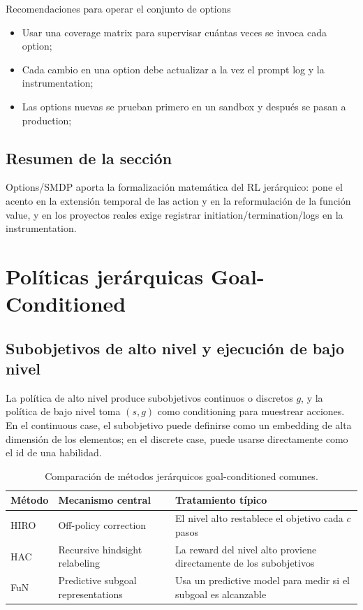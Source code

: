 \documentclass[a4paper]{article}
\begin{document}
\begin{importantbox}{Recomendaciones para operar el conjunto de options}
\begin{itemize}
    \item Usar una coverage matrix para supervisar cuántas veces se invoca cada option;
    \item Cada cambio en una option debe actualizar a la vez el prompt log y la instrumentation;
    \item Las options nuevas se prueban primero en un sandbox y después se pasan a production;
\end{itemize}
\end{importantbox}

\subsection{Resumen de la sección}

Options/SMDP aporta la formalización matemática del RL jerárquico: pone el acento en la extensión temporal de las action y en la reformulación de la función value, y en los proyectos reales exige registrar initiation/termination/logs en la instrumentation.
\section{Políticas jerárquicas Goal-Conditioned}

\subsection{Subobjetivos de alto nivel y ejecución de bajo nivel}

La política de alto nivel produce subobjetivos continuos o discretos \(g\), y la política de bajo nivel toma \((s, g)\) como conditioning para muestrear acciones. En el continuous case, el subobjetivo puede definirse como un embedding de alta dimensión de los elementos; en el discrete case, puede usarse directamente como el id de una habilidad.

\begin{table}[H]
\centering
\begin{tabular}{p{3cm}p{5cm}p{4cm}}
\toprule
Método & Mecanismo central & Tratamiento típico \\
\midrule
HIRO & Off-policy correction & El nivel alto restablece el objetivo cada $c$ pasos \\
HAC & Recursive hindsight relabeling & La reward del nivel alto proviene directamente de los subobjetivos \\
FuN & Predictive subgoal representations & Usa un predictive model para medir si el subgoal es alcanzable \\
\bottomrule
\end{tabular}
\caption{Comparación de métodos jerárquicos goal-conditioned comunes.}
\end{table}
\end{document}
